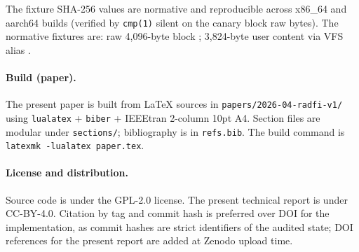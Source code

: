The fixture SHA-256 values are normative and reproducible across
x86\_64 and aarch64 builds (verified by \texttt{cmp(1)} silent on
the canary block raw bytes). The normative fixtures are: raw
4{,}096-byte block
\texttt{};
3{,}824-byte user content via VFS alias
\texttt{}.

\paragraph{Build (paper).}
The present paper is built from LaTeX sources in
\texttt{papers/2026-04-radfi-v1/} using \texttt{lualatex} +
\texttt{biber} + IEEEtran 2-column 10pt A4. Section files are
modular under \texttt{sections/}; bibliography is in
\texttt{refs.bib}. The build command is
\texttt{latexmk -lualatex paper.tex}.

\paragraph{License and distribution.}
Source code is under the GPL-2.0 license. The present technical
report is under CC-BY-4.0. Citation by tag and commit hash is
preferred over DOI for the implementation, as commit hashes are
strict identifiers of the audited state; DOI references for the
present report are added at Zenodo upload time.
